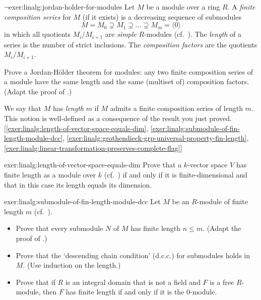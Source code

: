 \begin{exer}{$\lnot$}{exer:linalg:jordan-holder-for-modules}
  Let $M$ be a module over a ring $R$. A \emph{finite composition
    series} for $M$ (if it exists) is a decreasing sequence of
  submodules
  \[
    M = M_0 \supsetneq M_1 \supsetneq \dots \supsetneq M_m = \langle 0
    \rangle
  \]
  in which all quotients $M_i/M_{i+1}$ are \emph{simple} $R$-modules
  (cf.\ ). The \emph{length} of a series is the
  number of strict inclusions. The \emph{composition factors} are the
  quotients $M_i/M_{i+1}$.

  Prove a Jordan-H\"older theorem for modules: any two finite
  composition series of a module have the same length and the same
  (multiset of) composition factors. (Adapt the proof of
  .)

  We say that $M$ has \emph{length} $m$ if $M$ admits a finite
  composition series of length $m$. This notion is well-defined as a
  consequence of the result you just
  proved. [\ref{exer:linalg:length-of-vector-space-equals-dim},
  \ref{exer:linalg:submodule-of-fin-length-module-dcc},
  \ref{exer:linalg:grothendieck-grp-universal-property-fin-length},
  \ref{exer:linalg:linear-transformation-preserves-complete-flag}]
\end{exer}
\begin{exer}{}{exer:linalg:length-of-vector-space-equals-dim}
  Prove that a $k$-vector space $V$ has finite length as a module over
  $k$ (cf.\ ) if and only
  if it is finite-dimensional and that in this case its length equals
  its dimension.
\end{exer}
\begin{exer}{}{exer:linalg:submodule-of-fin-length-module-dcc}
  Let $M$ be an $R$-module of finite length $m$ (cf.\
  ).
  \begin{itemize}
  \item Prove that every submodule $N$ of $M$ has finite length
    $n \leq m$. (Adapt the proof of
    .)
  \item Prove that the `descending chain condition' (d.c.c.) for
    submodules holds in $M$. (Use induction on the length.)
  \item Prove that if $R$ is an integral domain that is not a field
    and $F$ is a free $R$-module, then $F$ has finite length if and
    only if it is the $0$-module.
  \end{itemize}
\end{exer}
